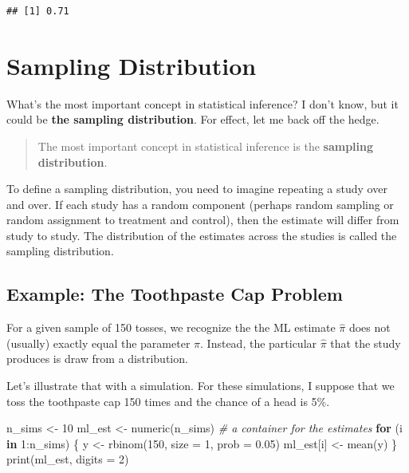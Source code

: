 \documentclass[
]{book}
\newenvironment{Shaded}{\begin{snugshade}}{\end{snugshade}}
\newcommand{\AttributeTok}[1]{\textcolor[rgb]{0.77,0.63,0.00}{#1}}
\newcommand{\CommentTok}[1]{\textcolor[rgb]{0.56,0.35,0.01}{\textit{#1}}}
\newcommand{\ControlFlowTok}[1]{\textcolor[rgb]{0.13,0.29,0.53}{\textbf{#1}}}
\newcommand{\DecValTok}[1]{\textcolor[rgb]{0.00,0.00,0.81}{#1}}
\newcommand{\FloatTok}[1]{\textcolor[rgb]{0.00,0.00,0.81}{#1}}
\newcommand{\FunctionTok}[1]{\textcolor[rgb]{0.00,0.00,0.00}{#1}}
\newcommand{\NormalTok}[1]{#1}
\newcommand{\OtherTok}[1]{\textcolor[rgb]{0.56,0.35,0.01}{#1}}
\newcommand{\SpecialCharTok}[1]{\textcolor[rgb]{0.00,0.00,0.00}{#1}}
\begin{document}
\begin{verbatim}
## [1] 0.71
\end{verbatim}

\hypertarget{sampling-distribution}{%
\section{Sampling Distribution}\label{sampling-distribution}}

What's the most important concept in statistical inference? I don't know, but it could be \textbf{the sampling distribution}. For effect, let me back off the hedge.

\begin{quote}
The most important concept in statistical inference is the \textbf{sampling distribution}.
\end{quote}

To define a sampling distribution, you need to imagine repeating a study over and over. If each study has a random component (perhaps random sampling or random assignment to treatment and control), then the estimate will differ from study to study. The distribution of the estimates across the studies is called the sampling distribution.

\hypertarget{example-the-toothpaste-cap-problem}{%
\subsection{Example: The Toothpaste Cap Problem}\label{example-the-toothpaste-cap-problem}}

For a given sample of 150 tosses, we recognize the the ML estimate \(\hat{\pi}\) does not (usually) exactly equal the parameter \(\pi\). Instead, the particular \(\hat{\pi}\) that the study produces is draw from a distribution.

Let's illustrate that with a simulation. For these simulations, I suppose that we toss the toothpaste cap 150 times and the chance of a head is 5\%.

\begin{Shaded}
\begin{Highlighting}[]
\NormalTok{n\_sims }\OtherTok{\textless{}{-}} \DecValTok{10}
\NormalTok{ml\_est }\OtherTok{\textless{}{-}} \FunctionTok{numeric}\NormalTok{(n\_sims)  }\CommentTok{\# a container for the estimates}
\ControlFlowTok{for}\NormalTok{ (i }\ControlFlowTok{in} \DecValTok{1}\SpecialCharTok{:}\NormalTok{n\_sims) \{}
\NormalTok{  y }\OtherTok{\textless{}{-}} \FunctionTok{rbinom}\NormalTok{(}\DecValTok{150}\NormalTok{, }\AttributeTok{size =} \DecValTok{1}\NormalTok{, }\AttributeTok{prob =} \FloatTok{0.05}\NormalTok{)}
\NormalTok{  ml\_est[i] }\OtherTok{\textless{}{-}} \FunctionTok{mean}\NormalTok{(y)}
\NormalTok{\}}
\FunctionTok{print}\NormalTok{(ml\_est, }\AttributeTok{digits =} \DecValTok{2}\NormalTok{)}
\end{Highlighting}
\end{Shaded}
\end{document}
